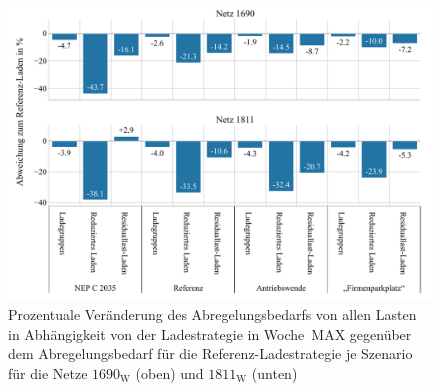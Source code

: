 \begin{figure}[H]
    \centering
    \includegraphics[width=\textwidth]{Bilder/1690_1811_cur_load_grid_week_B}
    \caption[Prozentuale Veränderung des Abregelungsbedarfs von allen Lasten in Abhängigkeit von der Ladestrategie in Woche~MAX gegenüber dem Abregelungsbedarf für die Referenz-Ladestrategie je Szenario für die Netze \num{1690} und \num{1811}]{Prozentuale Veränderung des Abregelungsbedarfs von allen Lasten in Abhängigkeit von der Ladestrategie in Woche~MAX gegenüber dem Abregelungsbedarf für die Referenz-Ladestrategie je Szenario für die Netze \(1690_{\text{W}}\) (oben) und \(1811_{\text{W}}\) (unten)}\label{fig:1690_1811_cur_load_grid_week_B}
\end{figure}